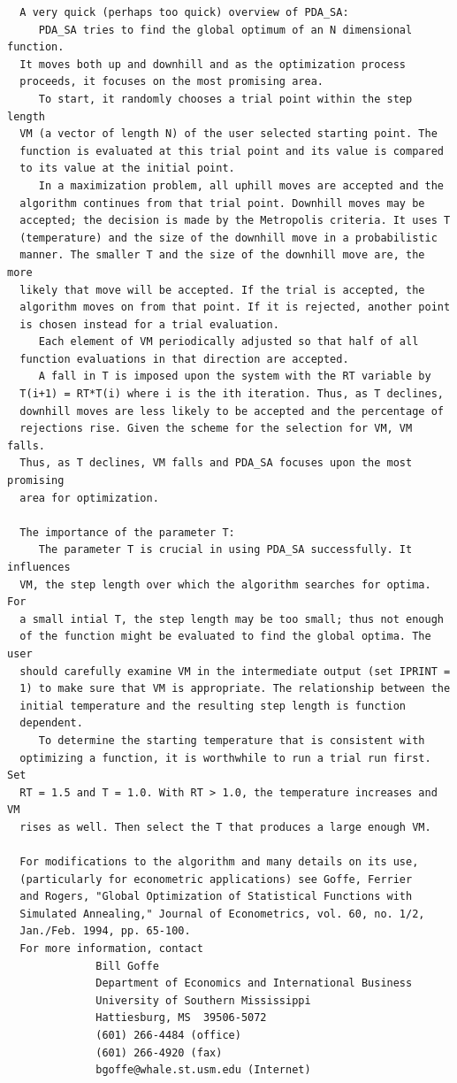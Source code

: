 \documentclass[11pt,twoside]{article}
\begin{document}
\begin{verbatim}
  A very quick (perhaps too quick) overview of PDA_SA:
     PDA_SA tries to find the global optimum of an N dimensional function.
  It moves both up and downhill and as the optimization process
  proceeds, it focuses on the most promising area.
     To start, it randomly chooses a trial point within the step length
  VM (a vector of length N) of the user selected starting point. The
  function is evaluated at this trial point and its value is compared
  to its value at the initial point.
     In a maximization problem, all uphill moves are accepted and the
  algorithm continues from that trial point. Downhill moves may be
  accepted; the decision is made by the Metropolis criteria. It uses T
  (temperature) and the size of the downhill move in a probabilistic
  manner. The smaller T and the size of the downhill move are, the more
  likely that move will be accepted. If the trial is accepted, the
  algorithm moves on from that point. If it is rejected, another point
  is chosen instead for a trial evaluation.
     Each element of VM periodically adjusted so that half of all
  function evaluations in that direction are accepted.
     A fall in T is imposed upon the system with the RT variable by
  T(i+1) = RT*T(i) where i is the ith iteration. Thus, as T declines,
  downhill moves are less likely to be accepted and the percentage of
  rejections rise. Given the scheme for the selection for VM, VM falls.
  Thus, as T declines, VM falls and PDA_SA focuses upon the most promising
  area for optimization.

  The importance of the parameter T:
     The parameter T is crucial in using PDA_SA successfully. It influences
  VM, the step length over which the algorithm searches for optima. For
  a small intial T, the step length may be too small; thus not enough
  of the function might be evaluated to find the global optima. The user
  should carefully examine VM in the intermediate output (set IPRINT =
  1) to make sure that VM is appropriate. The relationship between the
  initial temperature and the resulting step length is function
  dependent.
     To determine the starting temperature that is consistent with
  optimizing a function, it is worthwhile to run a trial run first. Set
  RT = 1.5 and T = 1.0. With RT > 1.0, the temperature increases and VM
  rises as well. Then select the T that produces a large enough VM.

  For modifications to the algorithm and many details on its use,
  (particularly for econometric applications) see Goffe, Ferrier
  and Rogers, "Global Optimization of Statistical Functions with
  Simulated Annealing," Journal of Econometrics, vol. 60, no. 1/2,
  Jan./Feb. 1994, pp. 65-100.
  For more information, contact
              Bill Goffe
              Department of Economics and International Business
              University of Southern Mississippi
              Hattiesburg, MS  39506-5072
              (601) 266-4484 (office)
              (601) 266-4920 (fax)
              bgoffe@whale.st.usm.edu (Internet)


\end{verbatim}
\end{document}
